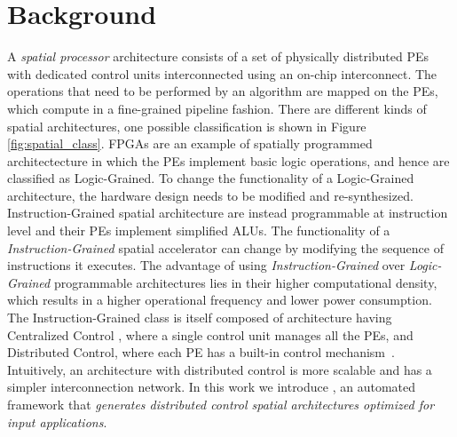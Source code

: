 \section{Background}
\label{sec:bg}

A \textit{spatial processor} architecture consists of a set of physically distributed PEs with dedicated control units interconnected using an on-chip interconnect. The operations that need to be performed by an algorithm are mapped on the PEs, which compute in a fine-grained pipeline fashion. There are different kinds of spatial architectures, one possible classification is shown in Figure \ref{fig:spatial_class}\cite{parashar2014efficient}. FPGAs are an example of spatially programmed architectecture in which the PEs implement basic logic operations, and hence are classified as Logic-Grained. To change the functionality of a Logic-Grained architecture, the hardware design needs to be modified and re-synthesized. Instruction-Grained spatial architecture are instead programmable at instruction level and their PEs implement simplified ALUs. The functionality of a \textit{Instruction-Grained} spatial accelerator can change by modifying the sequence of instructions it executes. The advantage of using \textit{Instruction-Grained} over \textit{Logic-Grained} programmable architectures lies in their higher computational density, which results in a higher operational frequency and lower power consumption\cite{parashar2014efficient}. The Instruction-Grained class is itself composed of architecture having Centralized Control\cite{swanson2007wavescalar} , where a single control unit manages all the PEs, and Distributed Control, where each PE has a built-in control mechanism~\cite{parashar2014efficient,prabhakar2017plasticine,cerqueira2020catena}. Intuitively, an architecture with distributed control is more scalable and has a simpler interconnection network.
In this work we introduce \frameworkname, an automated framework that \textit{generates distributed control spatial architectures optimized for input applications}.




